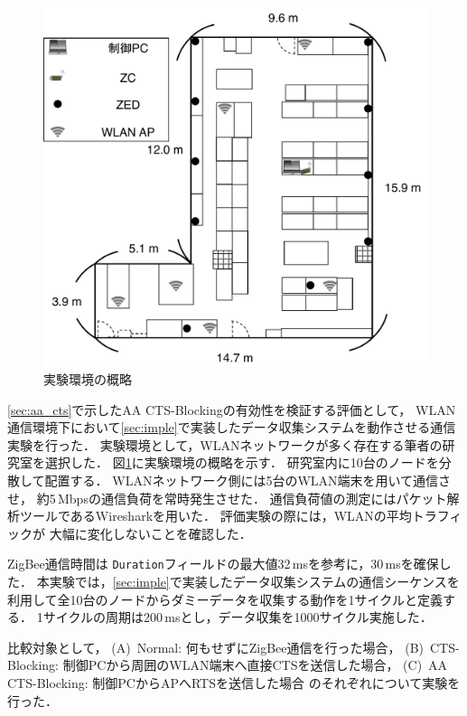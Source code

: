 \documentclass[12pt]{jreport}
\begin{document}
\begin{figure}[bt]
 \centering
 \includegraphics[width=\columnwidth]{figure/fukuda_lab.pdf}
 \caption{実験環境の概略}
 \label{fig:fukuda_lab}
\end{figure}

\ref{sec:aa_cts}で示したAA CTS-Blockingの有効性を検証する評価として，
WLAN通信環境下において\ref{sec:imple}で実装したデータ収集システムを動作させる通信実験を行った．
実験環境として，WLANネットワークが多く存在する筆者の研究室を選択した．
図\ref{fig:fukuda_lab}に実験環境の概略を示す．
研究室内に10台のノードを分散して配置する．
WLANネットワーク側には5台のWLAN端末を用いて通信させ，
約5\,Mbpsの通信負荷を常時発生させた．
通信負荷値の測定にはパケット解析ツールであるWiresharkを用いた．
評価実験の際には，WLANの平均トラフィックが
大幅に変化しないことを確認した．

ZigBee通信時間は
\texttt{Duration}フィールドの最大値32\,msを参考に，30\,msを確保した．
本実験では，\ref{sec:imple}で実装したデータ収集システムの通信シーケンスを
利用して全10台のノードからダミーデータを収集する動作を1サイクルと定義する．
1サイクルの周期は200\,msとし，データ収集を1000サイクル実施した．%

比較対象として，
(A)~Normal: 何もせずにZigBee通信を行った場合，
(B)~CTS-Blocking: 制御PCから周囲のWLAN端末へ直接CTSを送信した場合，
(C)~AA CTS-Blocking: 制御PCからAPへRTSを送信した場合
のそれぞれについて実験を行った．
\end{document}

